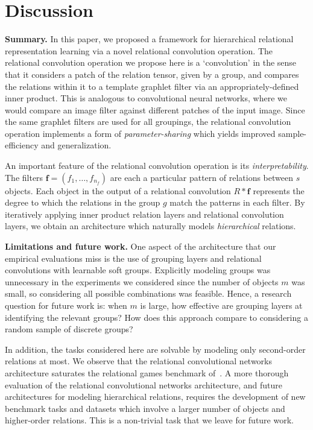 
\section{Discussion}\label{sec:discussion}

\textbf{Summary.} In this paper, we proposed a framework for hierarchical relational representation learning via a novel relational convolution operation. The relational convolution operation we propose here is a `convolution' in the sense that it considers a patch of the relation tensor, given by a group, and compares the relations within it to a template graphlet filter via an appropriately-defined inner product. This is analogous to convolutional neural networks, where we would compare an image filter against different patches of the input image. Since the same graphlet filters are used for all groupings, the relational convolution operation implements a form of \textit{parameter-sharing} which yields improved sample-efficiency and generalization.

An important feature of the relational convolution operation is its \textit{interpretability}. The filters $\bm{f} = (f_1, \ldots, f_{n_f})$ are each a particular pattern of relations between $s$ objects. Each object in the output of a relational convolution $R \ast \bm{f}$ represents the degree to which the relations in the group $g$ match the patterns in each filter. By iteratively applying inner product relation layers and relational convolution layers, we obtain an architecture which naturally models \textit{hierarchical} relations.

\textbf{Limitations and future work.} One aspect of the architecture that our empirical evaluations miss is the use of grouping layers and relational convolutions with learnable soft groups. Explicitly modeling groups was unnecessary in the experiments we considered since the number of objects $m$ was small, so considering all possible combinations was feasible. Hence, a research question for future work is: when $m$ is large, how effective are grouping layers at identifying the relevant groups? How does this approach compare to considering a random sample of discrete groups?

In addition, the tasks considered here are solvable by modeling only second-order relations at most. We observe that the relational convolutional networks architecture saturates the relational games benchmark of~\citep{shanahanExplicitlyRelationalNeural}. A more thorough evaluation of the relational convolutional networks architecture, and future architectures for modeling hierarchical relations, requires the development of new benchmark tasks and datasets which involve a larger number of objects and higher-order relations. This is a non-trivial task that we leave for future work.

